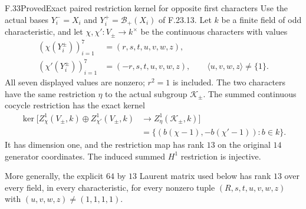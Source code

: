\begin{claim}{F.33}{Proved}{Exact paired restriction kernel for opposite first characters}
Use the actual bases $Y_i^-=X_i$ and
$Y_i^+=\mathcal B_+(X_i)$ of F.23.13.
Let $k$ be a finite field of odd characteristic,
and let $\chi,\chi':V_\pm\to k^\times$ be the
continuous characters with values
\[
 \begin{aligned}
 (\chi(Y_i^\pm))_{i=1}^7&=(r,s,t,u,v,w,z),\\
 (\chi'(Y_i^\pm))_{i=1}^7&=(-r,s,t,u,v,w,z),\qquad
             \langle u,v,w,z\rangle\ne\{1\}.
 \end{aligned}                                                \tag{F.33.1}
\]
All seven displayed values are nonzero; $r^2=1$
is included. The two characters have the same
restriction $\eta$ to the actual subgroup
$\mathcal K_\pm$. The summed continuous cocycle
restriction has the exact kernel
\[
 \begin{split}
 \ker\bigl[Z^1_\chi(V_\pm,k)\oplus
 Z^1_{\chi'}(V_\pm,k)
   &\longrightarrow Z^1_\eta(\mathcal K_\pm,k)\bigr]\\
   &=\{(b(\chi-1),-b(\chi'-1)):b\in k\}.
 \end{split}                                                  \tag{F.33.2}
\]
It has dimension one, and the restriction
map has rank $13$ on the original $14$
generator coordinates. The induced summed
$H^1$ restriction is injective.

More generally, the explicit $64$ by $13$
Laurent matrix used below has rank $13$
over every field, in every characteristic,
for every nonzero tuple $(R,s,t,u,v,w,z)$
with $(u,v,w,z)\ne(1,1,1,1)$.
\end{claim}

